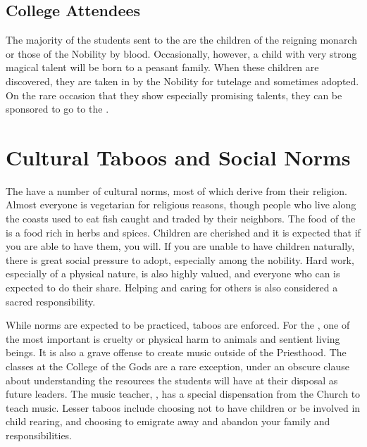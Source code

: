 \documentclass[blue]{GL2020}
\begin{document}
\subsection*{College Attendees}
The majority of the students sent to the \pSchool{} are the children of the reigning monarch or those of the Nobility by blood. Occasionally, however, a child with very strong magical talent will be born to a peasant family. When these children are discovered, they are taken in by the Nobility for tutelage and sometimes adopted. On the rare occasion that they show especially promising talents, they can be sponsored to go to the \pSchool{}.

\section*{Cultural Taboos and Social Norms}
The \pFarm{} have a number of cultural norms, most of which derive from their religion. Almost everyone is vegetarian for religious reasons, though people who live along the coasts used to eat fish caught and traded by their \pShip{} neighbors. The food of the \pFarm{} is a food rich in herbs and spices. Children are cherished and it is expected that if you are able to have them, you will. If you are unable to have children naturally, there is great social pressure to adopt, especially among the nobility. Hard work, especially of a physical nature, is also highly valued, and everyone who can is expected to do their share. Helping and caring for others is also considered a sacred responsibility.

While norms are expected to be practiced, taboos are enforced. For the \pFarmers{}, one of the most important is cruelty or physical harm to animals and sentient living beings. It is also a grave offense to create music outside of the Priesthood. The classes at the College of the Gods are a rare exception, under an obscure clause about understanding the resources the students will have at their disposal as future leaders. The music teacher, \cMusic{\full}, has a special dispensation from the Church to teach music. Lesser taboos include choosing not to have children or be involved in child rearing, and choosing to emigrate away and abandon your family and responsibilities.
\end{document}

